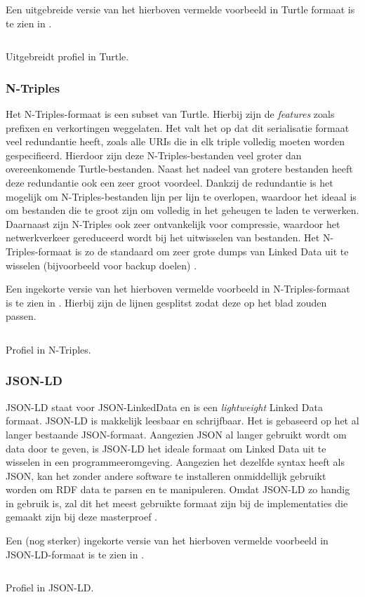 Een uitgebreide versie van het hierboven vermelde voorbeeld in Turtle formaat is te zien in .

\begin{listing}[ht]
    \inputminted{turtle}{data/profile.ttl}
    \caption{Uitgebreidt profiel in Turtle.}
    \label{listing:profile_turtle}
\end{listing}

\subsubsection{N-Triples}
Het N-Triples-formaat is een subset van Turtle. Hierbij zijn de \textit{features} zoals prefixen en verkortingen weggelaten. Het valt het op dat dit serialisatie formaat veel redundantie heeft, zoals alle URIs die in elk triple volledig moeten worden gespecifieerd. Hierdoor zijn deze N-Triples-bestanden veel groter dan overeenkomende Turtle-bestanden. Naast het nadeel van grotere bestanden heeft deze redundantie ook een zeer groot voordeel. Dankzij de redundantie is het mogelijk om N-Triples-bestanden lijn per lijn te overlopen, waardoor het ideaal is om bestanden die te groot zijn om volledig in het geheugen te laden te verwerken. Daarnaast zijn N-Triples ook zeer ontvankelijk voor compressie, waardoor het netwerkverkeer gereduceerd wordt bij het uitwisselen van bestanden. Het N-Triples-formaat is zo de standaard om zeer grote dumps van Linked Data uit te wisselen (bijvoorbeeld voor backup doelen) \cite{beckett2014rdfntriples}.

Een ingekorte versie van het hierboven vermelde voorbeeld in N-Triples-formaat is te zien in . Hierbij zijn de lijnen gesplitst zodat deze op het blad zouden passen.

\begin{listing}[ht]
    \inputminted{turtle}{data/profile_short.nt}
    \caption{Profiel in N-Triples.}
    \label{listing:profile_ntriples}
\end{listing}


\subsubsection{JSON-LD}
JSON-LD staat voor JSON-LinkedData en is een \textit{lightweight} Linked Data formaat. JSON-LD is makkelijk leesbaar en schrijfbaar. Het is gebaseerd op het al langer bestaande JSON-formaat. Aangezien JSON al langer gebruikt wordt om data door te geven, is JSON-LD het ideale formaat om Linked Data uit te wisselen in een programmeeromgeving. Aangezien het dezelfde syntax heeft als JSON, kan het zonder andere software te installeren onmiddellijk gebruikt worden om RDF data te parsen en te manipuleren. Omdat JSON-LD zo handig in gebruik is, zal dit het meest gebruikte formaat zijn bij de implementaties die gemaakt zijn bij deze masterproef \cite{sporny2012json}.

Een (nog sterker) ingekorte versie van het hierboven vermelde voorbeeld in JSON-LD-formaat is te zien in .

\begin{listing}[ht]
    \inputminted{json}{data/profile_short.jsonld}
    \caption{Profiel in JSON-LD.}
    \label{listing:profile_jsonld}
\end{listing}